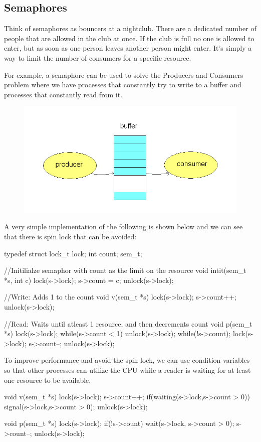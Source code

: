 \documentclass{hw}
\begin{document}
\subsection{Semaphores}
Think of semaphores as bouncers at a nightclub. There are a dedicated number of 
people that are allowed in the club at once. If the club is full no one is 
allowed to enter, but as soon as one person leaves another person might enter.
It's simply a way to limit the number of consumers for a specific resource. 

For example, a semaphore can be used to solve the Producers and Consumers problem
where we have processes that constantly try to write to a buffer and processes 
that constantly read from it.
\begin{figure}[H]
  \centering
  \includegraphics[scale=.45]{img/pcp}
\end{figure}

A very simple implementation of the following is shown below and we can see that 
there is spin lock that can be avoided:
\begin{C}
typedef struct{
    lock_t lock;
    int count;
}sem_t;

//Initilialze semaphor with count as the limit on the resource
void intit(sem_t *s, int c){
    lock(s->lock);
    s->count = c;
    unlock(s->lock);
}

//Write: Adds 1 to the count
void v(sem_t *s){
    lock(s->lock);
    s->count++;
    unlock(s->lock);
}

//Read: Waits until atleast 1 resource, and then decrements count
void p(sem_t *s){
    lock(s->lock);
    while(s->count < 1){
        unlock(s->lock);
        while(!s->count);
        lock(s->lock);
    }
    s->count--;
    unlock(s->lock);
}
\end{C}

To improve performance and avoid the spin lock,  we can use condition variables
so that other processes can utilize the CPU while a reader is waiting for at 
least one resource to be available. 
\begin{C}
void v(sem_t *s){
    lock(s->lock);
    s->count++;
    if(waiting(s->lock,s->count > 0)){
        signal(s->lock,s->count > 0);
    }
    unlock(s->lock);
}

void p(sem_t *s){
    lock(s->lock);
    if(!s->count){
        wait(s->lock, s->count > 0);
    }
    s->count--;
    unlock(s->lock);
}
\end{C}
\end{document}
